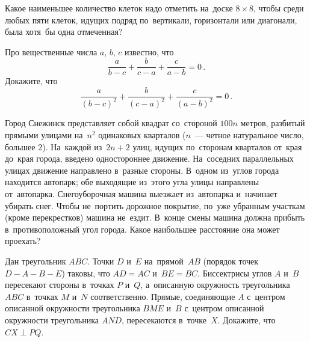 


\begin{problems}

\item
Какое наименьшее количество клеток надо отметить на~доске $8 \times 8$, чтобы
среди любых пяти клеток, идущих подряд по~вертикали, горизонтали или диагонали,
была хотя~бы одна отмеченная?

\item
Про вещественные числа $a$, $b$, $c$ известно, что
\[
    \frac{a}{b - c} + \frac{b}{c - a} + \frac{c}{a - b} = 0
\, . \]
Докажите, что
\[
    \frac{a}{(b - c)^2} + \frac{b}{(c - a)^2} + \frac{c}{(a - b)^2} = 0
\, . \]


\item
Город Снежинск представляет собой квадрат со~стороной $100 n$ метров, разбитый
прямыми улицами на~$n^2$ одинаковых кварталов
($n$~--- четное натуральное число, большее $2$).
На~каждой из~$2 n + 2$ улиц, идущих по~сторонам кварталов от~края до~края
города, введено одностороннее движение.
На~соседних параллельных улицах движение направлено в~разные стороны.
В~одном из~углов города находится автопарк;
обе выходящие из~этого угла улицы направлены от~автопарка.
Снегоуборочная машина выезжает из~автопарка и~начинает убирать снег.
Чтобы не~портить дорожное покрытие, по~уже убранным участкам
(кроме перекрестков) машина не~ездит.
В~конце смены машина должна прибыть в~противоположный угол города.
Какое наибольшее расстояние она может проехать?

\item
Дан треугольник $ABC$.
Точки $D$ и~$E$ на~прямой~$AB$ (порядок точек $D {-} A {-} B {-} E$) таковы,
что $AD = AC$ и~$BE = BC$.
Биссектрисы углов $A$ и~$B$ пересекают стороны в~точках $P$ и~$Q$, а~описанную
окружность треугольника $ABC$ в~точках $M$ и~$N$ соответственно.
Прямые, соединяющие $A$ с~центром описанной окружности треугольника $BME$ и~$B$
с~центром описанной окружности треугольника $AND$, пересекаются в~точке~$X$.
Докажите, что $CX \perp PQ$.


\end{problems}

